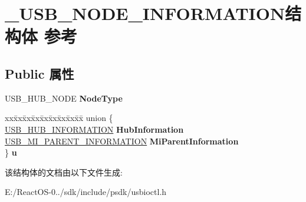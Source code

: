 \hypertarget{struct___u_s_b___n_o_d_e___i_n_f_o_r_m_a_t_i_o_n}{}\section{\+\_\+\+U\+S\+B\+\_\+\+N\+O\+D\+E\+\_\+\+I\+N\+F\+O\+R\+M\+A\+T\+I\+O\+N结构体 参考}
\label{struct___u_s_b___n_o_d_e___i_n_f_o_r_m_a_t_i_o_n}
\subsection*{Public 属性}
\begin{DoxyCompactItemize}
\item 
\mbox{\label{struct___u_s_b___n_o_d_e___i_n_f_o_r_m_a_t_i_o_n_a0d7b5f74d22e12ab41204eea3dbc1560}} 
U\+S\+B\+\_\+\+H\+U\+B\+\_\+\+N\+O\+DE {\bfseries Node\+Type}
\item 
\mbox{\label{struct___u_s_b___n_o_d_e___i_n_f_o_r_m_a_t_i_o_n_ac6e61893f0b1caba39dc1befac440865}} 
\begin{tabbing}
xx\=xx\=xx\=xx\=xx\=xx\=xx\=xx\=xx\=\kill
union \{\\
\>\hyperlink{struct___u_s_b___h_u_b___i_n_f_o_r_m_a_t_i_o_n}{USB\_HUB\_INFORMATION} {\bfseries HubInformation}\\
\>\hyperlink{struct___u_s_b___m_i___p_a_r_e_n_t___i_n_f_o_r_m_a_t_i_o_n}{USB\_MI\_PARENT\_INFORMATION} {\bfseries MiParentInformation}\\
\} {\bfseries u}\\

\end{tabbing}\end{DoxyCompactItemize}


该结构体的文档由以下文件生成\+:\begin{DoxyCompactItemize}
\item 
E\+:/\+React\+O\+S-\/0../sdk/include/psdk/usbioctl.\+h\end{DoxyCompactItemize}
